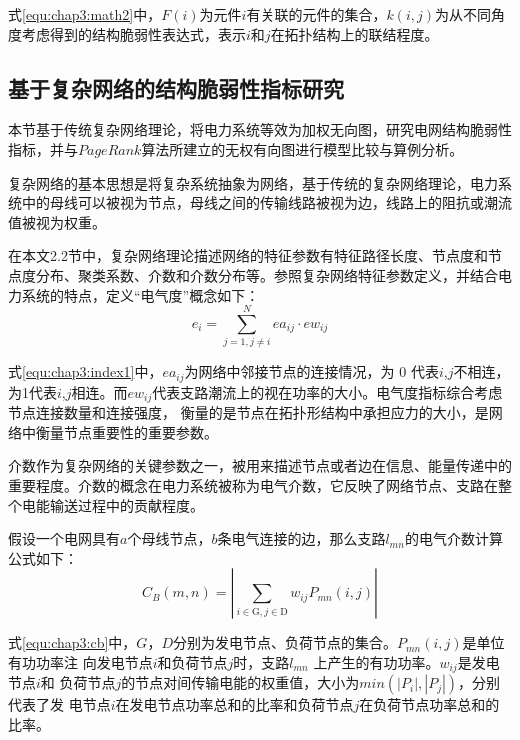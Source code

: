 式\ref{equ:chap3:math2}中，$F(i)$为元件$i$有关联的元件的集合，$k(i,j)$为从不同角度考虑得到的结构脆弱性表达式，表示$i$和$j$在拓扑结构上的联结程度。



\subsection{基于复杂网络的结构脆弱性指标研究}
\label{sec:network}

本节基于传统复杂网络理论，将电力系统等效为加权无向图，研究电网结构脆弱性指标，并与$PageRank$算法所建立的无权有向图进行模型比较与算例分析。

复杂网络的基本思想是将复杂系统抽象为网络，基于传统的复杂网络理论，电力系统中的母线可以被视为节点，母线之间的传输线路被视为边，线路上的阻抗或潮流值被视为权重。

在本文2.2节中，复杂网络理论描述网络的特征参数有特征路径长度、节点度和节点度分布、聚类系数、介数和介数分布等。参照复杂网络特征参数定义，并结合电力系统的特点，定义“电气度”概念如下：
\begin{equation}
\label{equ:chap3:index1}
  e_{i}=\sum_{j=1, j \neq i}^{N} e a_{i j} \cdot e w_{i j}
  \end{equation}

式\ref{equ:chap3:index1}中，$e a_{i j}$为网络中邻接节点的连接情况，为 0 代表$i$,$j$不相连，为1代表$i$,$j$相连。而$ew_{ij}$代表支路潮流上的视在功率的大小。电气度指标综合考虑节点连接数量和连接强度，
衡量的是节点在拓扑形结构中承担应力的大小，是网络中衡量节点重要性的重要参数。

介数作为复杂网络的关键参数之一，被用来描述节点或者边在信息、能量传递中的重要程度。介数的概念在电力系统被称为电气介数，它反映了网络节点、支路在整个电能输送过程中的贡献程度\cite{refs66,refs67}。

假设一个电网具有$a$个母线节点，$b$条电气连接的边，那么支路$l_{mn}$的电气介数计算公式如下：
\begin{equation}
\label{equ:chap3:cb}
  C_{B}(m, n)=\left|\sum_{i \in \mathrm{G}, j \in \mathrm{D}} w_{i j} P_{m n}(i, j)\right|
  \end{equation}

式\ref{equ:chap3:cb}中，$G$，$D$分别为发电节点、负荷节点的集合。$P_{mn} (i, j)$是单位有功功率注
向发电节点$i$和负荷节点$j$时，支路$l_{mn}$ 上产生的有功功率。$w_{ij}$是发电节点$i$和
负荷节点$j$的节点对间传输电能的权重值，大小为$min(|P_i|,|P_j|)$，分别代表了发
电节点$i$在发电节点功率总和的比率和负荷节点$j$在负荷节点功率总和的比率。

